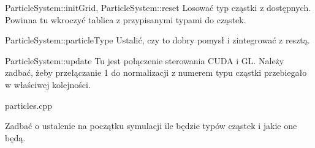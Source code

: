 \begin{DoxyVerbInclude}
ParticleSystem::initGrid, ParticleSystem::reset
Losować typ cząstki z dostępnych.
Powinna tu wkroczyć tablica z przypisanymi typami do cząstek.

ParticleSystem::particleType
Ustalić, czy to dobry pomysł i zintegrować z resztą.

ParticleSystem::update
Tu jest połączenie sterowania CUDA i GL.
Należy zadbać, żeby przełączanie 1 do normalizacji z numerem typu cząstki przebiegało w właściwej kolejności.

particles.cpp

Zadbać o ustalenie na początku symulacji ile będzie typów cząstek i jakie one będą.

\end{DoxyVerbInclude}
 